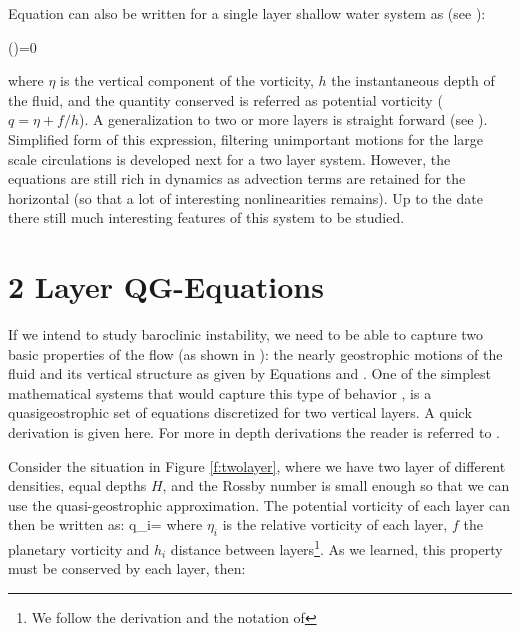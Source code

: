 Equation  can also be written for a single layer shallow water system as (see ):

\beq
{}\left(\right)=0

where $\eta$ is the vertical component of the vorticity, $h$ the instantaneous depth of the fluid, and the quantity conserved is referred as potential vorticity ($q=\eta + f/h$). A generalization to two or  more layers is straight forward (see ).  Simplified form of this
expression, filtering unimportant motions for the large scale circulations
is developed next for a two layer system. However, the equations are
still rich in dynamics as advection terms are retained for the horizontal
(so that a lot of interesting nonlinearities remains). Up to the date
there still much interesting features of this system to be studied.




\section{2 Layer QG-Equations}
\label{s:qg}
If we intend to study baroclinic instability, we need to be able to
capture two basic properties of the flow (as shown in
): the nearly geostrophic motions of the fluid and its vertical
structure as given by Equations  and . One of the simplest mathematical systems that would capture
this type of behavior , is a quasigeostrophic set of equations discretized
for two vertical layers. A quick derivation is given here. For more in
depth derivations the  reader is referred to
.

Consider the situation in Figure \ref{f:twolayer}, where we have two layer of different densities, equal depths $H$, and the Rossby number is small enough so that we can use the quasi-geostrophic approximation. The potential vorticity of each layer can then be written as:
\beq
q_i=
where $\eta_i$ is the relative vorticity of each layer, $f$ the planetary vorticity and $h_i$ distance between layers\footnote{We follow the derivation and the notation of }. As we learned, this property must be conserved by each layer, then:

